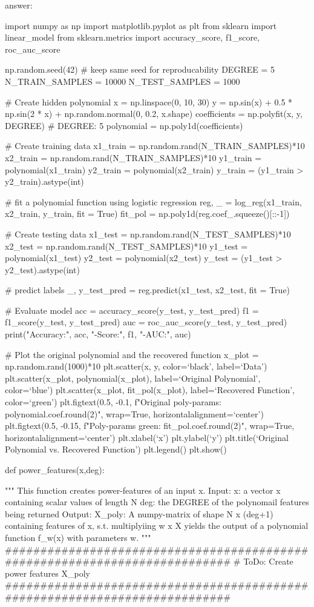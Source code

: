 \documentclass[
  letterpaper,
  DIV=11,
  numbers=noendperiod,
  oneside]{scrreprt}
\theoremstyle{remark}
\begin{document}
answer:

import numpy as np import matplotlib.pyplot as plt from sklearn import
linear\_model from sklearn.metrics import accuracy\_score, f1\_score,
roc\_auc\_score

np.random.seed(42) \# keep same seed for reproducability DEGREE = 5
N\_TRAIN\_SAMPLES = 10000 N\_TEST\_SAMPLES = 1000

\# Create hidden polynomial x = np.linspace(0, 10, 30) y = np.sin(x) +
0.5 * np.sin(2 * x) + np.random.normal(0, 0.2, x.shape) coefficients =
np.polyfit(x, y, DEGREE) \# DEGREE: 5 polynomial =
np.poly1d(coefficients)

\# Create training data x1\_train = np.random.rand(N\_TRAIN\_SAMPLES)*10
x2\_train = np.random.rand(N\_TRAIN\_SAMPLES)*10 y1\_train =
polynomial(x1\_train) y2\_train = polynomial(x2\_train) y\_train =
(y1\_train \textgreater{} y2\_train).astype(int)

\# fit a polynomial function using logistic regression reg, \_ =
log\_reg(x1\_train, x2\_train, y\_train, fit = True) fit\_pol =
np.poly1d(reg.coef\_.squeeze(){[}::-1{]})

\# Create testing data x1\_test = np.random.rand(N\_TEST\_SAMPLES)*10
x2\_test = np.random.rand(N\_TEST\_SAMPLES)*10 y1\_test =
polynomial(x1\_test) y2\_test = polynomial(x2\_test) y\_test = (y1\_test
\textgreater{} y2\_test).astype(int)

\# predict labels \_, y\_test\_pred = reg.predict(x1\_test, x2\_test,
fit = True)

\# Evaluate model acc = accuracy\_score(y\_test, y\_test\_pred) f1 =
f1\_score(y\_test, y\_test\_pred) auc = roc\_auc\_score(y\_test,
y\_test\_pred) print("Accuracy:", acc, "-Score:", f1, "-AUC:", auc)

\# Plot the original polynomial and the recovered function x\_plot =
np.random.rand(1000)*10 plt.scatter(x, y, color=`black', label=`Data')
plt.scatter(x\_plot, polynomial(x\_plot), label=`Original Polynomial',
color=`blue') plt.scatter(x\_plot, fit\_pol(x\_plot), label=`Recovered
Function', color=`green') plt.figtext(0.5, -0.1, f"Original poly-params:
polynomial.coef.round(2)", wrap=True, horizontalalignment=`center')
plt.figtext(0.5, -0.15, f"Poly-params green: fit\_pol.coef.round(2)",
wrap=True, horizontalalignment=`center') plt.xlabel(`x') plt.ylabel(`y')
plt.title(`Original Polynomial vs. Recovered Function') plt.legend()
plt.show()

def power\_features(x,deg):

""" This function creates power-features of an input x. Input: x: a
vector x containing scalar values of length N deg: the DEGREE of the
polynomail features being returned Output: X\_poly: A numpy-matrix of
shape N x (deg+1) containing features of x, s.t. multiplyiing w x X
yields the output of a polynomial function f\_w(x) with parameters w.
"""
\#\#\#\#\#\#\#\#\#\#\#\#\#\#\#\#\#\#\#\#\#\#\#\#\#\#\#\#\#\#\#\#\#\#\#\#\#\#\#\#\#\#\#\#\#\#\#\#\#\#\#\#\#\#\#\#\#\#\#\#\#\#\#\#\#\#\#\#\#\#\#\#\#\#\#
\# ToDo: Create power features X\_poly
\#\#\#\#\#\#\#\#\#\#\#\#\#\#\#\#\#\#\#\#\#\#\#\#\#\#\#\#\#\#\#\#\#\#\#\#\#\#\#\#\#\#\#\#\#\#\#\#\#\#\#\#\#\#\#\#\#\#\#\#\#\#\#\#\#\#\#\#\#\#\#\#\#\#\#
\end{document}

